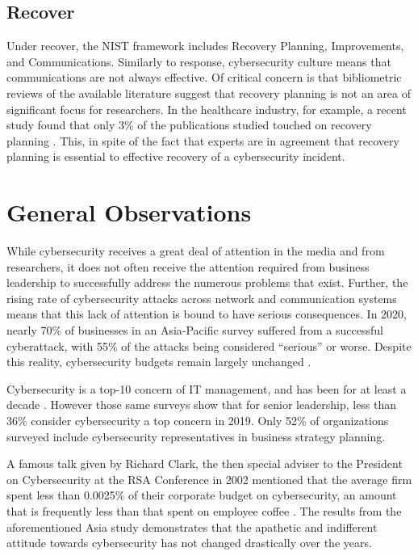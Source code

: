 \subsection{Recover}

Under recover, the NIST framework includes Recovery Planning, Improvements, and Communications. Similarly to response, cybersecurity culture means that communications are not always effective. Of critical concern is that bibliometric reviews of the available literature suggest that recovery planning is not an area of significant focus for researchers. In the healthcare industry, for example, a recent study found that only 3\% of the publications studied touched on recovery planning \parencite{jalaliHealthCareCybersecurity2019}. This, in spite of the fact that experts are in agreement that recovery planning is essential to effective  recovery of a cybersecurity incident.

\section{General Observations}

While cybersecurity receives a great deal of attention in the media and from researchers, it does not often receive the attention required from business leadership to successfully address the numerous problems that exist. Further, the rising rate of cybersecurity attacks across network and communication systems means that this lack of attention is bound to have serious consequences. In 2020, nearly 70\% of businesses in an Asia-Pacific survey suffered from a successful cyberattack, with 55\% of the attacks being considered ``serious'' or worse. Despite this reality, cybersecurity budgets remain largely unchanged \parencite{CyberattacksRiseStagnant2021}.

Cybersecurity is a top-10 concern of IT management, and has been for at least a decade \parencite{chrismaurerCybersecurityItWorse2021}. However those same surveys show that for senior leadership, less than 36\% consider cybersecurity a top concern in 2019. Only 52\% of organizations surveyed include cybersecurity representatives in business strategy planning.

A famous talk given by Richard Clark, the then special adviser to the President on Cybersecurity at the RSA Conference in 2002 mentioned that the average firm spent less than 0.0025\% of their corporate budget on cybersecurity, an amount that is frequently less than that spent on employee coffee \parencite{lemosSecurityGuruLet}. The results from the aforementioned Asia study demonstrates that the apathetic and indifferent attitude towards cybersecurity has not changed drastically over the years.

